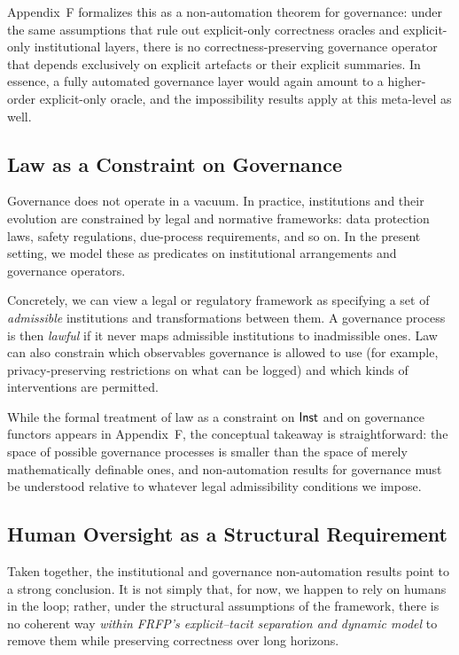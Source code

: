 Appendix~F formalizes this as a non-automation theorem for governance: under the same assumptions that rule out explicit-only correctness oracles and explicit-only institutional layers, there is no correctness-preserving governance operator that depends exclusively on explicit artefacts or their explicit summaries. In essence, a fully automated governance layer would again amount to a higher-order explicit-only oracle, and the impossibility results apply at this meta-level as well.

\subsection{Law as a Constraint on Governance}

Governance does not operate in a vacuum. In practice, institutions and their evolution are constrained by legal and normative frameworks: data protection laws, safety regulations, due-process requirements, and so on. In the present setting, we model these as predicates on institutional arrangements and governance operators.

Concretely, we can view a legal or regulatory framework as specifying a set of \emph{admissible} institutions and transformations between them. A governance process is then \emph{lawful} if it never maps admissible institutions to inadmissible ones. Law can also constrain which observables governance is allowed to use (for example, privacy-preserving restrictions on what can be logged) and which kinds of interventions are permitted.

While the formal treatment of law as a constraint on $\mathsf{Inst}$ and on governance functors appears in Appendix~F, the conceptual takeaway is straightforward: the space of possible governance processes is smaller than the space of merely mathematically definable ones, and non-automation results for governance must be understood relative to whatever legal admissibility conditions we impose.

\subsection{Human Oversight as a Structural Requirement}

Taken together, the institutional and governance non-automation results point to a strong conclusion. It is not simply that, for now, we happen to rely on humans in the loop; rather, under the structural assumptions of the framework, there is no coherent way \emph{within FRFP’s explicit--tacit separation and dynamic model} to remove them while preserving correctness over long horizons.

